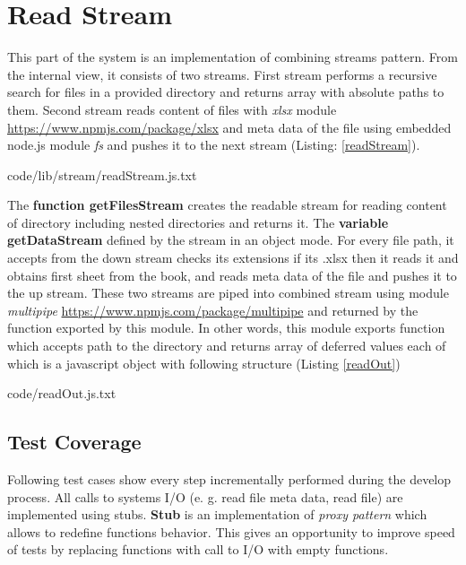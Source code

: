 \section{Read Stream}
\label{sec:read}
This part of the system is an implementation of combining streams pattern. From the internal view, it consists of two streams. First stream performs a recursive search for files in a provided directory and returns array with absolute paths to them. Second stream reads content of files with \textit{xlsx} module \url{https://www.npmjs.com/package/xlsx} and meta data of the file using embedded node.js module \textit{fs} and pushes it to the next stream (Listing: \ref{readStream}).


{code/lib/stream/readStream.js.txt}

The \textbf{function getFilesStream} creates the readable stream for reading content of directory including nested directories and returns it. 
The \textbf{variable getDataStream} defined by the stream in an object mode. For every file path, it accepts from the down stream  checks its extensions if its .xlsx then it reads it and obtains first sheet from the book, and reads meta data of the file and pushes it to the up stream.
These two streams are piped into combined stream using module \textit{multipipe} \url{https://www.npmjs.com/package/multipipe} and returned by the function exported by this module.
In other words, this module exports function which accepts path to the directory and returns array of deferred values each of which is a javascript object with following structure (Listing \ref{readOut})

{code/readOut.js.txt}

\subsection{Test Coverage}
Following test cases show every step incrementally performed during the develop process. All calls to systems I/O (e. g. read file meta data, read file) are implemented using stubs. \textbf{Stub} is an implementation of \textit{proxy pattern} which allows to redefine functions behavior. This gives an opportunity to improve speed of tests by replacing functions with call to I/O with empty functions.
%


